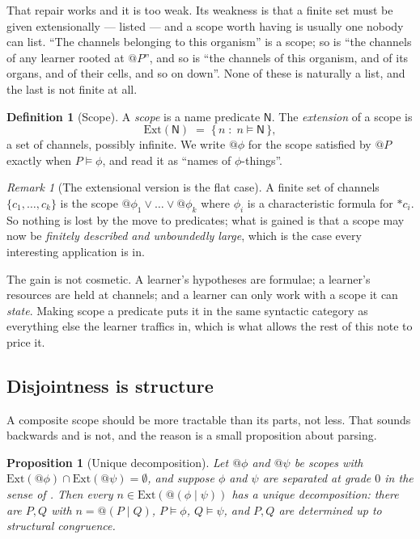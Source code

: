 \documentclass[11pt]{article}
\makeatletter
\theoremstyle{plain}
\newtheorem{proposition}[theorem]{Proposition}
\theoremstyle{definition}
\newtheorem{definition}[theorem]{Definition}
\theoremstyle{remark}
\newtheorem{remark}[theorem]{Remark}
\newcommand{\Nsp}{\mathsf{N}}
\newcommand{\quo}[1]{@#1}
\newcommand{\drop}[1]{*#1}
\newcommand{\Ext}{\mathrm{Ext}}
\makeatother
\begin{document}
That repair works and it is too weak. Its weakness is that a finite set
must be given extensionally --- listed --- and a scope worth having is
usually one nobody can list. ``The channels belonging to this organism''
is a scope; so is ``the channels of any learner rooted at $\quo{P}$'', and
so is ``the channels of this organism, and of its organs, and of their
cells, and so on down''. None of these is naturally a list, and the last is
not finite at all.

\begin{definition}[Scope]\label{sco:def:scope}
A \emph{scope} is a name predicate $\Nsp$. The \emph{extension} of a scope
is
\[
  \Ext(\Nsp) \;=\; \{\, n \;:\; n \models \Nsp \,\},
\]
a set of channels, possibly infinite. We write $\quo{\phi}$ for the scope
satisfied by $\quo{P}$ exactly when $P \models \phi$, and read it as
``names of $\phi$-things''.
\end{definition}

\begin{remark}[The extensional version is the flat case]\label{sco:rem:flat}
A finite set of channels $\{c_1,\dots,c_k\}$ is the scope
$\quo{\phi_1} \lor \dots \lor \quo{\phi_k}$ where $\phi_i$ is a
characteristic formula for $\drop{c_i}$. So nothing is lost by the move to
predicates; what is gained is that a scope may now be \emph{finitely
described and unboundedly large}, which is the case every interesting
application is in.
\end{remark}

The gain is not cosmetic. A learner's hypotheses are formulae; a learner's
resources are held at channels; and a learner can only work with a scope
it can \emph{state}. Making scope a predicate puts it in the same
syntactic category as everything else the learner traffics in, which is
what allows the rest of this note to price it.

\subsection{Disjointness is structure}\label{sco:S3.3}

A composite scope should be more tractable than its parts, not less. That
sounds backwards and is not, and the reason is a small proposition about
parsing.

\begin{proposition}[Unique decomposition]\label{sco:prop:parse}
Let $\quo{\phi}$ and $\quo{\psi}$ be scopes with
$\Ext(\quo{\phi}) \cap \Ext(\quo{\psi}) = \emptyset$, and suppose $\phi$
and $\psi$ are separated at grade $0$ in the sense of \cite[\S5]{compose}.
Then every $n \in \Ext(\quo{(\phi \mid \psi)})$ has a unique
decomposition: there are $P, Q$ with $n = \quo{(P \mid Q)}$,
$P \models \phi$, $Q \models \psi$, and $P, Q$ are determined up to
structural congruence.
\end{proposition}
\end{document}
